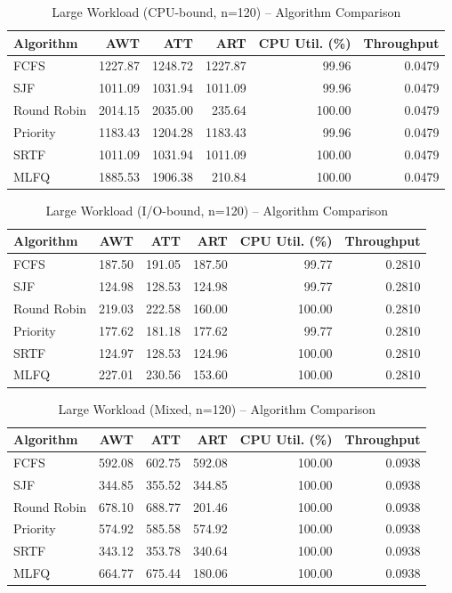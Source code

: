 \begin{table}[H]
\centering
\small
\begin{tabular}{lrrrrr}
\toprule
Algorithm & AWT & ATT & ART & CPU Util. (\%) & Throughput \\
\midrule
FCFS & 1227.87 & 1248.72 & 1227.87 & 99.96 & 0.0479 \\
SJF & 1011.09 & 1031.94 & 1011.09 & 99.96 & 0.0479 \\
Round Robin & 2014.15 & 2035.00 & 235.64 & 100.00 & 0.0479 \\
Priority & 1183.43 & 1204.28 & 1183.43 & 99.96 & 0.0479 \\
SRTF & 1011.09 & 1031.94 & 1011.09 & 100.00 & 0.0479 \\
MLFQ & 1885.53 & 1906.38 & 210.84 & 100.00 & 0.0479 \\
\bottomrule
\end{tabular}
\caption{Large Workload (CPU-bound, n=120) -- Algorithm Comparison}
\label{tab:large_cpu_bound}
\end{table}

\begin{table}[H]
\centering
\small
\begin{tabular}{lrrrrr}
\toprule
Algorithm & AWT & ATT & ART & CPU Util. (\%) & Throughput \\
\midrule
FCFS & 187.50 & 191.05 & 187.50 & 99.77 & 0.2810 \\
SJF & 124.98 & 128.53 & 124.98 & 99.77 & 0.2810 \\
Round Robin & 219.03 & 222.58 & 160.00 & 100.00 & 0.2810 \\
Priority & 177.62 & 181.18 & 177.62 & 99.77 & 0.2810 \\
SRTF & 124.97 & 128.53 & 124.96 & 100.00 & 0.2810 \\
MLFQ & 227.01 & 230.56 & 153.60 & 100.00 & 0.2810 \\
\bottomrule
\end{tabular}
\caption{Large Workload (I/O-bound, n=120) -- Algorithm Comparison}
\label{tab:large_io_bound}
\end{table}

\begin{table}[H]
\centering
\small
\begin{tabular}{lrrrrr}
\toprule
Algorithm & AWT & ATT & ART & CPU Util. (\%) & Throughput \\
\midrule
FCFS & 592.08 & 602.75 & 592.08 & 100.00 & 0.0938 \\
SJF & 344.85 & 355.52 & 344.85 & 100.00 & 0.0938 \\
Round Robin & 678.10 & 688.77 & 201.46 & 100.00 & 0.0938 \\
Priority & 574.92 & 585.58 & 574.92 & 100.00 & 0.0938 \\
SRTF & 343.12 & 353.78 & 340.64 & 100.00 & 0.0938 \\
MLFQ & 664.77 & 675.44 & 180.06 & 100.00 & 0.0938 \\
\bottomrule
\end{tabular}
\caption{Large Workload (Mixed, n=120) -- Algorithm Comparison}
\label{tab:large_mixed}
\end{table}